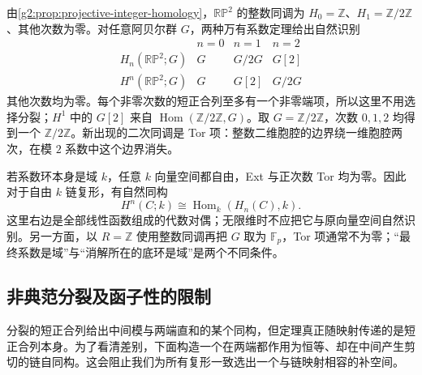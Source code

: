 \begin{example}\label{g2:exm:rp2-coefficients}
	由\cref{g2:prop:projective-integer-homology}，\(\mathbb{RP}^2\) 的整数同调为 \(H_0=\mathbb Z\)、\(H_1=\mathbb Z/2\mathbb Z\)、其他次数为零。对任意阿贝尔群 \(G\)，两种万有系数定理给出自然识别
	\[
		\begin{array}{c|ccc}
			&n=0&n=1&n=2\\ \hline
			H_n(\mathbb{RP}^2;G)&G&G/2G&G[2]\\
			H^n(\mathbb{RP}^2;G)&G&G[2]&G/2G
		\end{array}
	\]
	其他次数均为零。每个非零次数的短正合列至多有一个非零端项，所以这里不用选择分裂；\(H^1\) 中的 \(G[2]\) 来自 \(\operatorname{Hom}(\mathbb Z/2\mathbb Z,G)\)。取 \(G=\mathbb Z/2\mathbb Z\)，次数 \(0,1,2\) 均得到一个 \(\mathbb Z/2\mathbb Z\)。新出现的二次同调是 Tor 项：整数二维胞腔的边界绕一维胞腔两次，在模 \(2\) 系数中这个边界消失。
\end{example}

若系数环本身是域 \(k\)，任意 \(k\) 向量空间都自由，Ext 与正次数 Tor 均为零。因此对于自由 \(k\) 链复形，有自然同构
\[
	H^n(C;k)\cong\operatorname{Hom}_k(H_n(C),k).
\]
这里右边是全部线性函数组成的代数对偶；无限维时不应把它与原向量空间自然识别。另一方面，以 \(R=\mathbb Z\) 使用整数同调再把 \(G\) 取为 \(\mathbb F_p\)，Tor 项通常不为零；“最终系数是域”与“消解所在的底环是域”是两个不同条件。

\subsection{非典范分裂及函子性的限制}
\label{g2:subsec:0402:04}
分裂的短正合列给出中间模与两端直和的某个同构，但定理真正随映射传递的是短正合列本身。为了看清差别，下面构造一个在两端都作用为恒等、却在中间产生剪切的链自同构。这会阻止我们为所有复形一致选出一个与链映射相容的补空间。

